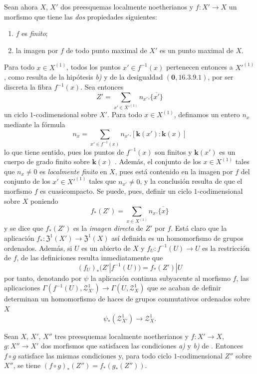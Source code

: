 \begin{env}[21.10.14]
\label{IV.21.10.14}
Sean ahora $X$, $X'$ dos preesquemas localmente noetherianos y $f:X'\to X$ un morfismo que tiene las \emph{dos} propiedades siguientes:
\begin{enumerate}[label=\emph{\alph*)}]
  \item $f$ es \emph{finito};
  \item la imagen por $f$ de todo punto maximal de $X'$ es un punto maximal de $X$.
\end{enumerate}
Para todo $x\in X^{(1)}$, todos los puntos $x'\in f^{-1}(x)$ pertenecen entonces a $X'^{(1)}$, como resulta de la hipótesis \emph{b)} y de la desigualdad $(\mathbf{0},16.3.9.1)$, por ser discreta la fibra $f^{-1}(x)$.
Sea entonces
\[
  Z'=\sum_{x'\in X'^{(1)}}n_{x'}.\overline{\{x'\}}
\]
un ciclo $1$-codimensional sobre $X'$.
Para todo $x\in X^{(1)}$, definamos un entero $n_x$ mediante la fórmula
\[
  n_x=\sum_{x'\in f^{-1}(x)}n_{x'}.[\boldsymbol{k}(x'): \boldsymbol{k}(x)]
\]
lo que tiene sentido, pues los puntos de $f^{-1}(x)$ son finitos y $\boldsymbol{k}(x')$ es un cuerpo de grado finito sobre $\boldsymbol{k}(x)$ .
Además, el conjunto de los $x\in X^{(1)}$ tales que $n_x\neq0$ es \emph{localmente finito} en $X$, pues está contenido en la imagen por $f$ del conjunto de los $x'\in X'^{(1)}$ tales que $n_{x'}\neq0$, y la conclusión resulta de que el morfismo $f$ es cuasicompacto.
Se puede, pues, definir un ciclo $1$-codimensional sobre $X$ poniendo
\[
\label{IV.21.10.14.1}
  f_*(Z')=\sum_{x\in X^{(1)}}n_x.\overline{\{x\}}
  \tag{21.10.14.1}
\]
y se dice que $f_*(Z')$ es la \emph{imagen directa} de $Z'$ por $f$.
Está claro que la aplicación $f_*:\mathfrak{Z}^1(X')\to\mathfrak{Z}^1(X)$ así definida es un homomorfismo de grupos ordenados.
Además, si $U$ es un abierto de $X$ y $f_U:f^{-1}(U)\to U$ es la restricción de $f$, de las definiciones resulta inmediatamente que
\[
\label{IV.21.10.14.2}
  (f_U)_*(Z'|f^{-1}(U))=f_*(Z')|U
  \tag{21.10.14.2}
\]
por tanto, denotando por $\psi$ la aplicación continua subyacente al morfismo $f$, las aplicaciones $\Gamma(f^{-1}(U),\mathscr{Z}^1_{X'})\to\Gamma(U,\mathscr{Z}^1_X)$ que se acaban de definir determinan un homomorfismo de haces de grupos conmutativos ordenados sobre $X$
\[
  \psi_*(\mathscr{Z}^1_{X'})\to\mathscr{Z}^1_X.
\]
\end{env}


\begin{proposition}[21.10.15]
\label{IV.21.10.15}

Sean $X$, $X'$, $X''$ tres preesquemas localmente noetherianos y $f:X'\to X$, $g:X''\to X'$ dos morfismos que satisfacen las condiciones \emph{a)} y \emph{b)} de .
Entonces $f\circ g$ satisface las mismas condiciones y, para todo ciclo $1$-codimensional $Z''$ sobre $X''$, se tiene
$(f\circ g)_*(Z'')=f_*(g_*(Z''))$.
\end{proposition}

